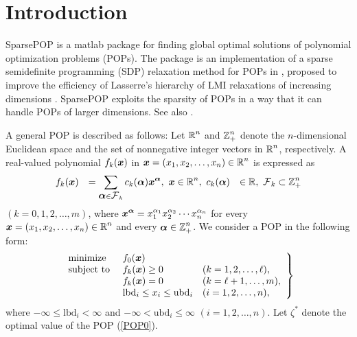 \section{Introduction}


SparsePOP is a matlab package for finding global optimal solutions of polynomial
optimization problems (POPs). 
The package is an implementation
of a sparse semidefinite programming (SDP) relaxation method for POPs  in  \cite{WAKI04}, proposed
to improve
the efficiency of  Lasserre's hierarchy of LMI relaxations of increasing dimensions 
\cite{LAS01}.  SparsePOP
exploits the sparsity of POPs in a way that it can handle  POPs of larger dimensions.
See also \cite{KIM03,KOJ03a}. 


A general POP is described as follows: 
Let $\Real^n$ and $\Integer^n_+$  denote the $n$-dimensional
Euclidean space and the set of nonnegative integer vectors in $\Real^n$, respectively. 
A real-valued polynomial $f_k(\x)$ 
in $\x =(x_1,x_2,\ldots,x_n) \in \Real^n$ is expressed as
\[
	\begin{array}{lllll}
     f_k(\x) & = \displaystyle \sum_{\balpha \in \FC_k} c_k(\balpha) \x^{\salpha},\ \x \in \Real^n,   \
	 c_k(\balpha)  & \in \Real, \ 
	\FC_k  \subset \Integer_+^n
	\end{array}
\]
$(k=0,1,2,\ldots,m)$, where      
$\displaystyle \x^{\salpha} = x_1^{\alpha_1}x_2^{\alpha_2} \cdots
x_n^{\alpha_n}$ for every $\x =(x_1,x_2,\ldots,x_n) \in \Real^n$ and 
every $\balpha \in \Integer^n_+$.
We consider a POP in the following form: 
\begin{equation}
\left.
\begin{array}{llll}
\mbox{minimize } & f_0(\x) \\
\mbox{subject to } & f_k (\x) \geq 0 & (k=1,2,\ldots,\ell), \\
                                 & f_k(\x) = 0 & (k=\ell+1,\ldots,m), \\
                                 & \mbox{lbd}_i \leq x_i \leq \mbox{ubd}_i & (i=1,2,\ldots,n), 
\end{array}
\right\} \label{POP0}
\end{equation}
where $-\infty \leq  \mbox{lbd}_i < \infty$ and $-\infty <  \mbox{ubd}_i \leq \infty$ $(i=1,2,\ldots,n)$. 
Let $\zeta^*$ denote the optimal value of the POP (\ref{POP0}). 

